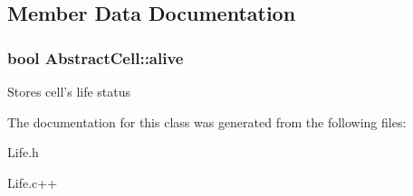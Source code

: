 \subsection{Member Data Documentation}
\hypertarget{classAbstractCell_aa92e42d5bb67f3249d8e2dde2c3228e7}{
\subsubsection[{alive}]{\setlength{\rightskip}{0pt plus 5cm}bool Abstract\-Cell\-::alive\hspace{0.3cm}{\ttfamily [protected]}}}\label{classAbstractCell_aa92e42d5bb67f3249d8e2dde2c3228e7}
Stores cell's life status 

The documentation for this class was generated from the following files\-:\begin{DoxyCompactItemize}
\item 
Life.\-h\item 
Life.\-c++\end{DoxyCompactItemize}
